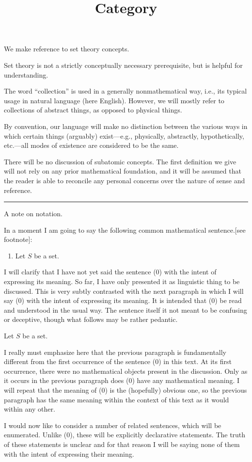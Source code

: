 \documentclass[12pt]{article}
\title{Category \\
    \large 
}
\author{}
\date{}
\newcommand{\sepline}{\rule{\textwidth}{0.4pt}}
\theoremstyle{definition}
\newcommand{\<}{\left\langle}
\renewcommand{\>}{\right\rangle}
\begin{document}
We make reference to set theory concepts.

Set theory is not a strictly conceptually necessary prerequisite, but is helpful for understanding.

The word ``collection'' is used in a generally nonmathematical way, i.e., its typical usage in natural language (here English).
However, we will mostly refer to collections of abstract things, as opposed to physical things.

By convention, our language will make no distinction between the various ways in which certain things (arguably) exist---e.g., physically, abstractly, hypothetically, etc.---all modes of existence are considered to be the same.

There will be no discussion of subatomic concepts.
The first definition we give will not rely on any prior mathematical foundation, and it will be assumed that the reader is able to reconcile any personal concerns over the nature of sense and reference.

\sepline

A note on notation.

In a moment I am going to say the following common mathematical sentence.[see footnote]:
\begin{enumerate}[(0)]
    \item Let $S$ be a set.
\end{enumerate}
I will clarify that I have not yet said the sentence (0) with the intent of expressing its meaning.
So far, I have only presented it as linguistic thing to be discussed.
This is very subtly contrasted with the next paragraph in which I will say (0) with the intent of expressing its meaning.
It is intended that (0) be read and understood in the usual way.
The sentence itself it not meant to be confusing or deceptive, though what follows may be rather pedantic.

Let $S$ be a set.

I really must emphasize here that the previous paragraph is fundamentally different from the first occurrence of the sentence (0) in this text.
At its first occurrence, there were no mathematical objects present in the discussion.
Only as it occurs in the previous paragraph does (0) have any mathematical meaning.
I will repeat that the meaning of (0) is the (hopefully) obvious one, so the previous paragraph has the same meaning within the context of this text as it would within any other.

I would now like to consider a number of related sentences, which will be enumerated.
Unlike (0), these will be explicitly declarative statements.
The truth of these statements is unclear and for that reason I will be saying none of them with the intent of expressing their meaning.
\end{document}

